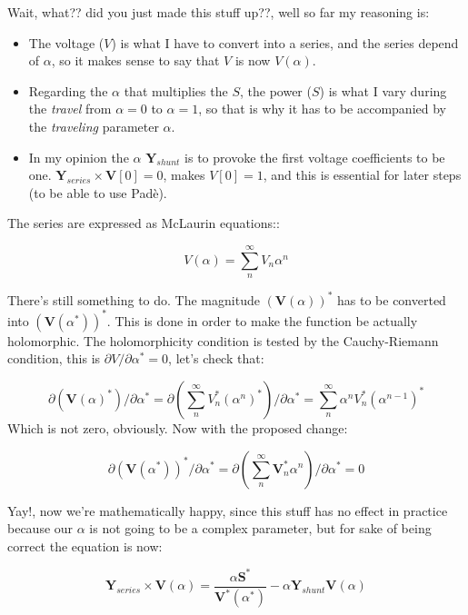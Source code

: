 \documentclass[11pt,fleqn]{book} %
\begin{document}
Wait, what?? did you just made this stuff up??, well so far my reasoning is:
\begin{itemize}
	\item The voltage ($V$) is what I have to convert into a series, and the series depend of $\alpha$, so it makes sense to say that $V$ is now $V(\alpha)$.
	
	\item Regarding the $\alpha$ that multiplies the $S$, the power ($S$) is what I vary during the \textit{travel} from $\alpha=0$ to $\alpha=1$, so that is why it has to be accompanied by the \textit{traveling} parameter $\alpha.$
	
	\item In my opinion the $\alpha$ $\textbf{Y}_{shunt}$ is to provoke the first voltage coefficients to be one.  $\textbf{Y}_{series} \times \textbf{V}[0] = 0$, makes $V[0]=1$, and this is essential for later steps (to be able to use Padè). \newline
\end{itemize}

The series are expressed as McLaurin equations::

\begin{equation}
V(\alpha) = \sum_{n}^{\infty} V_n \alpha ^n
\label{eq:McLaurinV}
\end{equation}

\begin{theorem}

There's still something to do. The magnitude $\left(\textbf{V}( \alpha )\right)^*$ has to be converted into $\left(\textbf{V}( \alpha^* )\right)^*$. This is done in order to make the function be actually holomorphic. The holomorphicity condition is tested by the Cauchy-Riemann condition, this is $\partial V / \partial \alpha^* = 0$, let's check that:

\begin{equation}
\partial \left(\textbf{V}( \alpha )^*\right) / \partial \alpha^*  = \partial \left(\sum_{n}^{\infty} V_n^* (\alpha ^n)^*\right) / \partial \alpha^*  = \sum_{n}^{\infty} \alpha ^n V_n^* (\alpha ^{n-1})^*
\end{equation} 
Which is not zero, obviously. Now with the proposed change:

\begin{equation}
\partial \left( \textbf{V}( \alpha^* )\right)^* / \partial \alpha^*  = \partial \left(\sum_{n}^{\infty} \textbf{V}_n^* \alpha ^n \right) / \partial \alpha^*  = 0
\end{equation} 

Yay!, now we're mathematically happy, since this stuff has no effect in practice because our $\alpha$ is not going to be a complex parameter, but for sake of being correct the equation is now:

\begin{equation}
{\textbf{Y}_{series}\times \textbf{V}( \alpha )} = \frac{ \alpha\textbf{S}^*}{\textbf{V}^*( \alpha^* )} - \alpha \textbf{Y}_{shunt} \textbf{V}( \alpha )
\label{base_eq_embedded2}
\end{equation}

\end{theorem}
\end{document}
